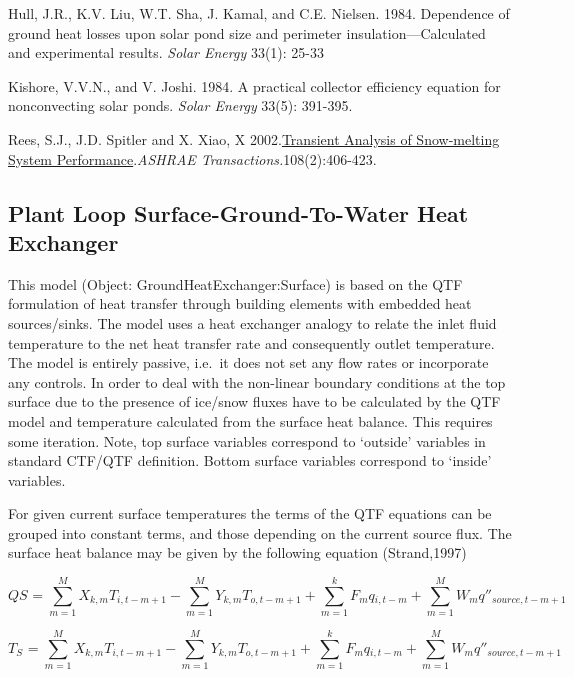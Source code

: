 Hull, J.R., K.V. Liu, W.T. Sha, J. Kamal, and C.E. Nielsen. 1984. Dependence of ground heat losses upon solar pond size and perimeter insulation---Calculated and experimental results. \emph{Solar Energy} 33(1): 25-33

Kishore, V.V.N., and V. Joshi. 1984. A practical collector efficiency equation for nonconvecting solar ponds. \emph{Solar Energy} 33(5): 391-395.

Rees, S.J., J.D. Spitler and X. Xiao, X 2002.\href{http://www.hvac.okstate.edu/pdfs/Rees_Spitler_Xiao_02.pdf}{Transient Analysis of Snow-melting System Performance}.\emph{ASHRAE Transactions.}108(2):406-423.

\subsection{Plant Loop Surface-Ground-To-Water Heat Exchanger}\label{plant-loop-surface-ground-to-water-heat-exchanger}

This model (Object: GroundHeatExchanger:Surface) is based on the QTF formulation of heat transfer through building elements with embedded heat sources/sinks. The model uses a heat exchanger analogy to relate the inlet fluid temperature to the net heat transfer rate and consequently outlet temperature. The model is entirely passive, i.e.~it does not set any flow rates or incorporate any controls. In order to deal with the non-linear boundary conditions at the top surface due to the presence of ice/snow fluxes have to be calculated by the QTF model and temperature calculated from the surface heat balance. This requires some iteration. Note, top surface variables correspond to `outside' variables in standard CTF/QTF definition. Bottom surface variables correspond to `inside' variables.

For given current surface temperatures the terms of the QTF equations can be grouped into constant terms, and those depending on the current source flux. The surface heat balance may be given by the following equation (Strand,1997)

\begin{equation}
QS{}_{} = \sum\limits_{m = 1}^M {X{}_{k,m}} T{}_{i,t - m + 1} - \sum\limits_{m = 1}^M {Y{}_{k,m}} T{}_{o,t - m + 1} + \sum\limits_{m = 1}^k {F{}_m} q{}_{i,t - m} + \sum\limits_{m = 1}^M {W{}_m} {q''}{}_{source,t - m + 1}
\end{equation}

\begin{equation}
T{}_S{}_{} = \sum\limits_{m = 1}^M {X{}_{k,m}} T{}_{i,t - m + 1} - \sum\limits_{m = 1}^M {Y{}_{k,m}} T{}_{o,t - m + 1} + \sum\limits_{m = 1}^k {F{}_m} q{}_{i,t - m} + \sum\limits_{m = 1}^M {W{}_m} q''{}_{source,t - m + 1}
\end{equation}

